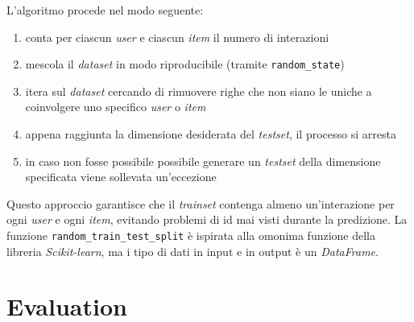 L'algoritmo procede nel modo seguente:
\begin{enumerate}
    \item conta per ciascun \textit{user} e ciascun \textit{item} il numero di interazioni
    \item mescola il \textit{dataset} in modo riproducibile (tramite \texttt{random\_state})
    \item itera sul \textit{dataset} cercando di rimuovere righe che non siano le uniche a coinvolgere uno specifico \textit{user} o \textit{item}
    \item appena raggiunta la dimensione desiderata del \textit{testset}, il processo si arresta
    \item in caso non fosse possibile possibile generare un \textit{testset} della dimensione specificata viene sollevata un'eccezione
\end{enumerate}

Questo approccio garantisce che il \textit{trainset} contenga almeno un'interazione per ogni \textit{user} e ogni \textit{item}, evitando problemi di id mai visti durante la predizione. La funzione \texttt{random\_train\_test\_split} è ispirata alla omonima funzione della libreria \textit{Scikit-learn}, ma i tipo di dati in input e in output è un \textit{DataFrame}.

\section{Evaluation}

